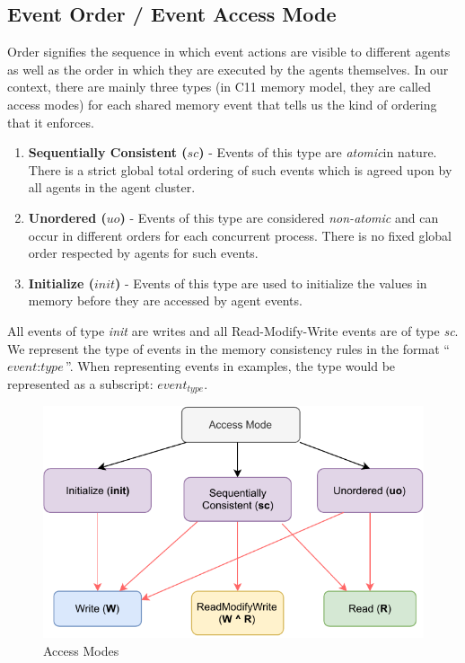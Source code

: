     
    \subsection{Event Order / Event Access Mode} 
        Order signifies the sequence in which event actions are visible to different agents as well as the order in which they are executed by the agents themselves. In our context, there are mainly three types (in C11 memory model, they are called access modes) for each shared memory event that tells us the kind of ordering that it enforces. 
        
        \begin{enumerate}
            \item \textbf{Sequentially Consistent ($sc$)} - Events of this type are \textit{atomic}\footnotemark  in nature. There is a strict global total ordering of such events which is agreed upon by all agents in the agent cluster. 
            
            \item \textbf{Unordered ($uo$)} - Events of this type are considered \textit{non-atomic} and can occur in different orders for each concurrent process. There is no fixed global order respected by agents for such events. 
            
            \item \textbf{Initialize ($init$)} - Events of this type are used to initialize the values in memory before they are accessed by agent events. 
        \end{enumerate}

        All events of type \textit{init} are writes and all Read-Modify-Write events are of type \textit{sc}.  
        We represent the type of events in the memory consistency rules in the format ``$\textit{event} : \textit{type}$''. 
        When representing events in examples, the type would be represented as a subscript: $\textit{event}_\textit{type}$. 
       
        \begin{figure}[H]
            \centering
            \includegraphics[scale=0.7]{ECMAScriptMemoryModel/AccessModes.pdf}
            \caption{Access Modes}
        \end{figure}

